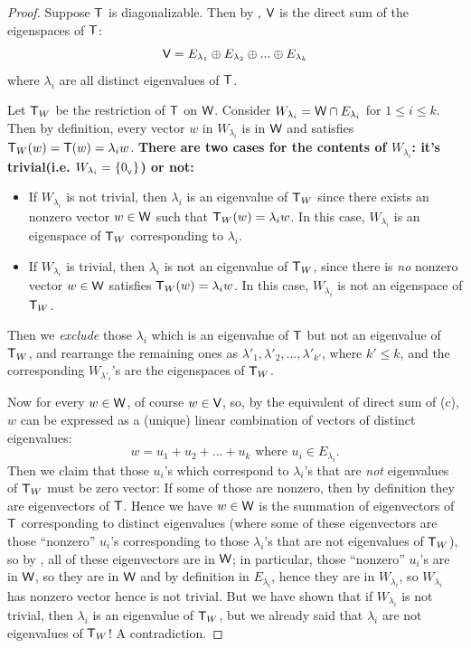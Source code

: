 \begin{proof}

Suppose \(\textsf{T}\) is diagonalizable.
Then by , \(\textsf{V}\) is the direct sum of the eigenspaces of \(\textsf{T}\):
\[
    \textsf{V} = E_{\lambda_1} \oplus E_{\lambda_2} \oplus ... \oplus E_{\lambda_k}
\]
where \(\lambda_i\) are all distinct eigenvalues of \(\textsf{T}\).

Let \(\textsf{T}_W\) be the restriction of \(\textsf{T}\) on \(\textsf{W}\).
Consider \(W_{\lambda_i} = \textsf{W} \cap E_{\lambda_i}\) for \(1 \le i \le k\).
Then by definition, every vector \(w\) in \(W_{\lambda_i}\) is in \(\textsf{W}\) and satisfies \(\textsf{T}_W(w) = \textsf{T}(w) = \lambda_i w\).
\textbf{There are two cases for the contents of \(W_{\lambda_i}\): it's trivial(i.e. \(W_{\lambda_i} = \{ 0_{_{\textsf{V}}} \}\)) or not:}
\begin{itemize}
\item If \(W_{\lambda_i}\) is not trivial, then \(\lambda_i\) is an eigenvalue of \(\textsf{T}_W\) since there exists an nonzero vector \(w \in \textsf{W}\) such that \(\textsf{T}_W(w) = \lambda_i w\).
In this case, \(W_{\lambda_i}\) is an eigenspace of \(\textsf{T}_W\) corresponding to \(\lambda_i\).
\item If \(W_{\lambda_i}\) is trivial, then \(\lambda_i\) is not an eigenvalue of \(\textsf{T}_W\), since there is \emph{no} nonzero vector \(w \in \textsf{W}\) satisfies \(\textsf{T}_W(w) = \lambda_i w\).
In this case, \(W_{\lambda_i}\) is not an eigenspace of \(\textsf{T}_W\).
\end{itemize}

Then we \emph{exclude} those \(\lambda_i\) which is an eigenvalue of \(\textsf{T}\) but not an eigenvalue of \(\textsf{T}_W\),
and rearrange the remaining ones as \(\lambda'_1, \lambda'_2, ..., \lambda'_{k'}\), where \(k' \le k\), and the corresponding \(W_{\lambda'_{i}}\)'s are the eigenspaces of \(\textsf{T}_W\).

Now for every \(w \in \textsf{W}\), of course \(w \in \textsf{V}\), so, by the equivalent of direct sum of (c), \(w\) can be expressed as a (unique) linear combination of vectors of distinct eigenvalues:
\[
    w = u_1 + u_2 + ... + u_k \text{ where } u_i \in E_{\lambda_i}.
\]
Then we claim that those \(u_i\)'s which correspond to \(\lambda_i\)'s that are \emph{not} eigenvalues of \(\textsf{T}_W\) must be zero vector:
If some of those are nonzero, then by definition they are eigenvectors of \(\textsf{T}\).
Hence we have \(w \in \textsf{W}\) is the summation of eigenvectors of \(\textsf{T}\) corresponding to distinct eigenvalues (where some of these eigenvectors are those ``nonzero'' \(u_i\)'s corresponding to those \(\lambda_i\)'s that are not eigenvalues of \(\textsf{T}_W\)),
so by , all of these eigenvectors are in \(\textsf{W}\);
in particular, those ``nonzero'' \(u_i\)'s are in \(\textsf{W}\), so they are in \(\textsf{W}\) and by definition in \(E_{\lambda_i}\), hence they are in \(W_{\lambda_i}\), so \(W_{\lambda_i}\) has nonzero vector hence is not trivial.
But we have shown that if \(W_{\lambda_i}\) is not trivial, then \(\lambda_i\) is an eigenvalue of \(\textsf{T}_W\), but we already said that \(\lambda_i\) are not eigenvalues of \(\textsf{T}_W\)! A contradiction.


\end{proof}
